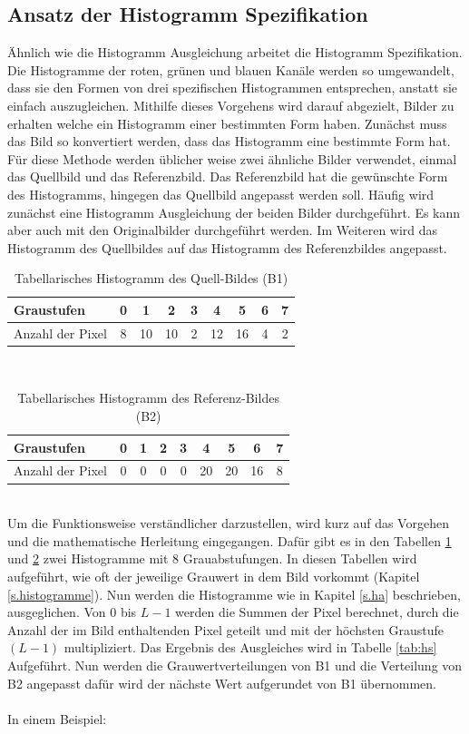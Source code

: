   \subsection{Ansatz der Histogramm Spezifikation}\label{s.hs}
Ähnlich wie die Histogramm Ausgleichung arbeitet die Histogramm Spezifikation. Die Histogramme der roten, grünen und blauen Kanäle werden so umgewandelt, dass sie den Formen von drei spezifischen Histogrammen entsprechen, anstatt sie einfach auszugleichen. Mithilfe dieses Vorgehens wird darauf abgezielt, Bilder zu erhalten welche ein Histogramm einer bestimmten Form haben. Zunächst muss das Bild so konvertiert werden, dass das Histogramm eine bestimmte Form hat. Für diese Methode werden üblicher weise zwei ähnliche Bilder verwendet, einmal das Quellbild und das Referenzbild. Das Referenzbild hat die gewünschte Form des Histogramms, hingegen das Quellbild angepasst werden soll. Häufig wird zunächst eine Histogramm Ausgleichung der beiden Bilder durchgeführt. Es kann aber auch mit den Originalbilder durchgeführt werden. Im Weiteren wird das Histogramm des Quellbildes auf das Histogramm des Referenzbildes angepasst.
  \begin{table}
  [h]
  \caption{Tabellarisches Histogramm des Quell-Bildes (B1)}
  \label{tab:b1}
  \centering
  \begin{tabular}{|l|c|c|c|c|c|c|c|c|}
  \hline
  Graustufen & 0 & 1 & 2 & 3 & 4 & 5 & 6 & 7\\
  \hline
  Anzahl der Pixel & 8 & 10 & 10 & 2 & 12 & 16 & 4 & 2\\
  \hline
  \end{tabular}
  \end{table}\\
  \begin{table}
  [h]
  \caption{Tabellarisches Histogramm des Referenz-Bildes (B2)}
  \label{tab:b2}
  \centering
  \begin{tabular}{|l|c|c|c|c|c|c|c|c|}
  \hline
  Graustufen & 0 & 1 & 2 & 3 & 4 & 5 & 6 & 7\\
  \hline
  Anzahl der Pixel & 0 & 0 & 0 & 0 & 20 & 20 & 16 & 8\\
  \hline
  \end{tabular}
  \end{table}\\
Um die Funktionsweise verständlicher darzustellen, wird kurz auf das Vorgehen und die mathematische Herleitung eingegangen. Dafür gibt es in den Tabellen \ref{tab:b1} und \ref{tab:b2} zwei Histogramme mit 8 Grauabstufungen. In diesen Tabellen wird aufgeführt, wie oft der jeweilige Grauwert in dem Bild vorkommt (Kapitel \ref{s.histogramme}). Nun werden die Histogramme wie in Kapitel \ref{s.ha} beschrieben, ausgeglichen. Von 0 bis $L-1$ werden die Summen der Pixel berechnet, durch die Anzahl der im Bild enthaltenden Pixel geteilt und mit der höchsten Graustufe $(L-1)$ multipliziert. Das Ergebnis des Ausgleiches wird in Tabelle \ref{tab:hs} Aufgeführt. Nun werden die Grauwertverteilungen von B1 und die Verteilung von B2 angepasst dafür wird der nächste Wert aufgerundet von B1 übernommen.\\\\
  In einem Beispiel:
  
